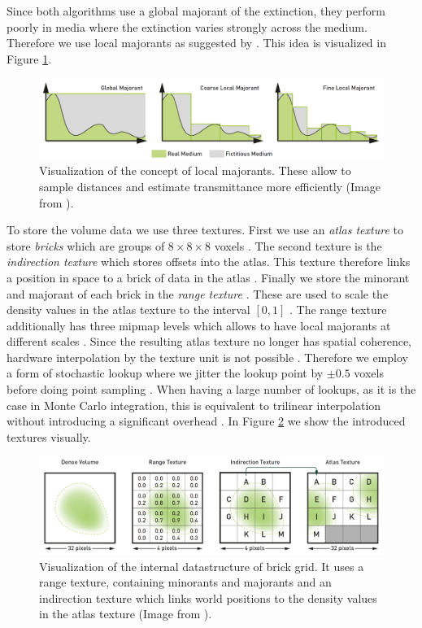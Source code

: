 Since both algorithms use a global majorant of the extinction, they perform poorly in media where the extinction varies strongly across the medium.
Therefore we use local majorants as suggested by \citeauthor{brick_grid} \cite{brick_grid}.
This idea is visualized in Figure \ref{fig:brick_grid_majorants}.
\begin{figure}[ht]
    \centering
    \includegraphics[width=0.9\linewidth]{img/brick_grid_majorants.png}
    \caption[Visualization of local density majorants]{Visualization of the concept of local majorants. These allow to sample distances and estimate transmittance more efficiently (Image from \cite{brick_grid}).}
    \label{fig:brick_grid_majorants}
\end{figure}
To store the volume data we use three textures.
First we use an \textit{atlas texture} to store \textit{bricks} which are groups of $8 \times 8 \times 8$ voxels \cite{brick_grid}.
The second texture is the \textit{indirection texture} which stores offsets into the atlas.
This texture therefore links a position in space to a brick of data in the atlas \cite{brick_grid}.
Finally we store the minorant and majorant of each brick in the \textit{range texture} \cite{brick_grid}.
These are used to scale the density values in the atlas texture to the interval $[0, 1]$ \cite{brick_grid}.
The range texture additionally has three mipmap levels which allows to have local majorants at different scales \cite{brick_grid}.
Since the resulting atlas texture no longer has spatial coherence, hardware interpolation by the texture unit is not possible \cite{brick_grid}.
Therefore we employ a form of stochastic lookup where we jitter the lookup point by $\pm0.5$ voxels before doing point sampling \cite{brick_grid}.
When having a large number of lookups, as it is the case in Monte Carlo integration, this is equivalent to trilinear interpolation without introducing a significant overhead \cite{brick_grid}.
In Figure \ref{fig:brick_grid_datastructure} we show the introduced textures visually.
\begin{figure}[ht]
    \centering
    \includegraphics[width=0.9\linewidth]{img/brick_grid_datastructure.png}
    \caption[Datastructure of brick grid]{Visualization of the internal datastructure of brick grid. It uses a range texture, containing minorants and majorants and an indirection texture which links world positions to the density values in the atlas texture (Image from \cite{brick_grid}).}
    \label{fig:brick_grid_datastructure}
\end{figure}

